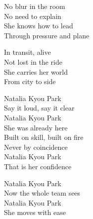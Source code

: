 \begin{lyrics}
No blur in the room\\
No need to explain\\
She knows how to lead\\
Through pressure and plane

In transit, alive\\
Not lost in the ride\\
She carries her world\\
From city to side

Natalia Kyou Park\\
Say it loud, say it clear\\
Natalia Kyou Park\\
She was already here\\
Built on skill, built on fire\\
Never by coincidence\\
Natalia Kyou Park\\
That is her confidence

Natalia Kyou Park\\
Now the whole team sees\\
Natalia Kyou Park\\
She moves with ease
\end{lyrics}

